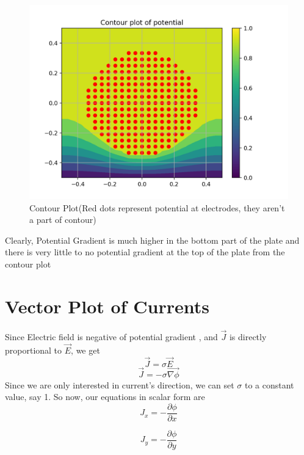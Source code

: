 \documentclass[12pt, a4paper]{report}
\begin{document}
\begin{figure}[!tbh]
   	\centering
   	\includegraphics[scale=0.75]{Q5.png}
   	\caption{Contour Plot(Red dots represent potential at electrodes, they aren't a part of contour)}
   	\label{fig:allgraphs}
 \end{figure} 
 
 Clearly, Potential Gradient is much higher in the bottom part of the plate and there is very little to no potential gradient at the top of the plate  from the contour plot 
 
 \newpage
 \section*{Vector Plot of Currents}
 Since Electric field is negative of potential gradient , and $\vec{J}$ is directly proportional to $\vec{E}$, we get 
 \begin{equation}
 \vec{J} = \sigma\vec{E}
 \end{equation}
  \begin{equation}
  \vec{J} = -\sigma\vec{\nabla\phi}
  \end{equation}
  Since we are only interested in current's direction, we can set $\sigma$ to a constant value, say 1.
  So now, our equations in scalar form are
   \begin{equation}
 J_x = -\frac{\partial\phi}{\partial x}
 \end{equation}
  
 \begin{equation}
 J_y = -\frac{\partial\phi}{\partial y}
 \end{equation}
 
\end{document}
